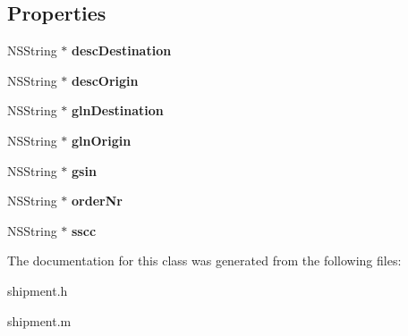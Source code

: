 \subsection*{Properties}
\begin{DoxyCompactItemize}
\item 
\hypertarget{interfaceshipment_ab5273ecc62e2940e5b5629b972b30b08}{}N\+S\+String $\ast$ {\bfseries desc\+Destination}\label{interfaceshipment_ab5273ecc62e2940e5b5629b972b30b08}

\item 
\hypertarget{interfaceshipment_aace58d17f8911382ab60caf4ff9ee8d6}{}N\+S\+String $\ast$ {\bfseries desc\+Origin}\label{interfaceshipment_aace58d17f8911382ab60caf4ff9ee8d6}

\item 
\hypertarget{interfaceshipment_a2a510360fedb7fbf304907da4b7e173d}{}N\+S\+String $\ast$ {\bfseries gln\+Destination}\label{interfaceshipment_a2a510360fedb7fbf304907da4b7e173d}

\item 
\hypertarget{interfaceshipment_a141d025180160863f10bcb50cc190a7c}{}N\+S\+String $\ast$ {\bfseries gln\+Origin}\label{interfaceshipment_a141d025180160863f10bcb50cc190a7c}

\item 
\hypertarget{interfaceshipment_a105a103efa30c928bf20c14fe2678aca}{}N\+S\+String $\ast$ {\bfseries gsin}\label{interfaceshipment_a105a103efa30c928bf20c14fe2678aca}

\item 
\hypertarget{interfaceshipment_ae55389daf16c9e4f9cbca93c830996af}{}N\+S\+String $\ast$ {\bfseries order\+Nr}\label{interfaceshipment_ae55389daf16c9e4f9cbca93c830996af}

\item 
\hypertarget{interfaceshipment_afa443001b84878901b654c811d148311}{}N\+S\+String $\ast$ {\bfseries sscc}\label{interfaceshipment_afa443001b84878901b654c811d148311}

\end{DoxyCompactItemize}


The documentation for this class was generated from the following files\+:\begin{DoxyCompactItemize}
\item 
shipment.\+h\item 
shipment.\+m\end{DoxyCompactItemize}
